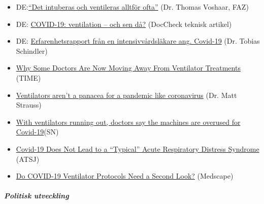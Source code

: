 \begin{itemize}
\tightlist
\item
  DE:\href{https://archive.is/KX5IQ}{``Det intuberas och ventileras
  alltför ofta''} (Dr. Thomas Voshaar, FAZ)
\item
  DE:
  \href{https://www.doccheck.com/de/detail/articles/26271-covid-19-beatmung-und-dann}{COVID-19:
  ventilation -- och sen då?} (DocCheck teknisk artikel)
\item
  DE:
  \href{https://www.frankenpost.de/region/oberfranken/laenderspiegel/Gefahr-durch-das-Beatmungsgeraet;art2388,7210803}{Erfarenhetsrapport
  från en intensivvårdsläkare ang. Covid-19} (Dr. Tobias Schindler)
\item
  \href{https://time.com/5818547/ventilators-coronavirus/}{Why Some
  Doctors Are Now Moving Away From Ventilator Treatments} (TIME)
\item
  \href{https://www.spectator.co.uk/article/Ventilators-aren-t-a-panacea-for-a-pandemic-like-coronavirus}{Ventilators
  aren't a panacea for a pandemic like coronavirus} (Dr. Matt Strauss)
\item
  \href{https://www.statnews.com/2020/04/08/doctors-say-ventilators-overused-for-covid-19/}{With
  ventilators running out, doctors say the machines are overused for
  Covid-19}(SN)
\item
  \href{https://www.atsjournals.org/doi/pdf/10.1164/rccm.202003-0817LE}{Covid-19
  Does Not Lead to a ``Typical'' Acute Respiratory Distress Syndrome}
  (ATSJ)
\item
  \href{https://www.medscape.com/viewarticle/928156}{Do COVID-19
  Ventilator Protocols Need a Second Look?} (Medscape)
\end{itemize}

\hypertarget{politisk-utveckling}{%
\subparagraph{\texorpdfstring{\textbf{Politisk
utveckling}}{Politisk utveckling}}\label{politisk-utveckling}}


